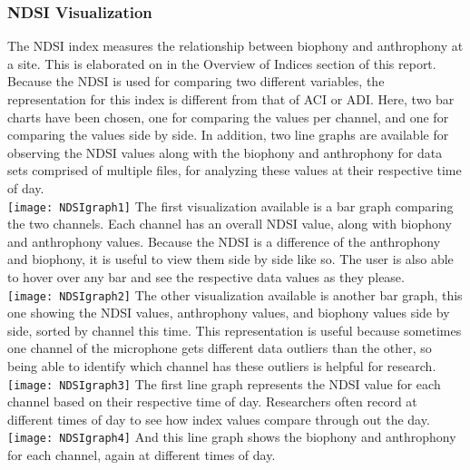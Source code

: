 \subsubsection{NDSI Visualization}
The NDSI index measures the relationship between biophony and anthrophony at a site. This is elaborated on in the Overview of Indices section of this report. Because the NDSI is used for comparing two different variables, the representation for this index is different from that of ACI or ADI. Here, two bar charts have been chosen, one for comparing the values per channel, and one for comparing the values side by side. In addition, two line graphs are available for observing the NDSI values along with the biophony and anthrophony for data sets comprised of multiple files, for analyzing these values at their respective time of day.\\

\texttt{[image: NDSIgraph1]}
The first visualization available is a bar graph comparing the two channels. Each channel has an overall NDSI value, along with biophony and anthrophony values. Because the NDSI is a difference of the anthrophony and biophony, it is useful to view them side by side like so. The user is also able to hover over any bar and see the respective data values as they please.\\

\texttt{[image: NDSIgraph2]}
The other visualization available is another bar graph, this one showing the NDSI values, anthrophony values, and biophony values side by side, sorted by channel this time. This representation is useful because sometimes one channel of the microphone gets different data outliers than the other, so being able to identify which channel has these outliers is helpful for research.\\

\texttt{[image: NDSIgraph3]}
The first line graph represents the NDSI value for each channel based on their respective time of day. Researchers often record at different times of day to see how index values compare through out the day.\\

\texttt{[image: NDSIgraph4]}
And this line graph shows the biophony and anthrophony for each channel, again at different times of day.
